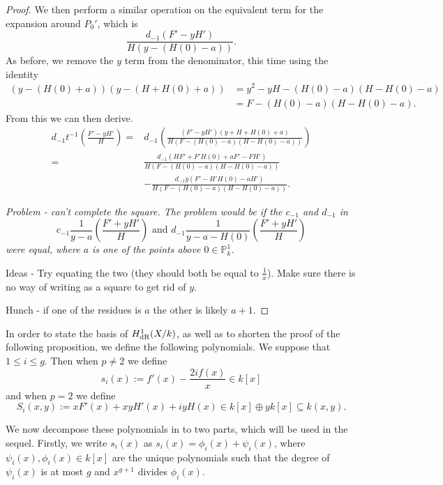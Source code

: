 \begin{proof}
We then perform a similar operation on the equivalent term for the expansion around $P_0'$, which is
\[
\frac{d_{-1}(F' - yH')}{H(y - (H(0) - a))}.
\]
As before, we remove the $y$ term from the denominator, this time using the identity
\begin{align*}
(y-(H(0)+a))(y - (H+H(0)+a)) &  = y^2 - yH - (H(0) - a)(H - H(0) - a) \\
& = F - (H(0)-a)(H - H(0) - a).
\end{align*}
From this we can then derive. 
\begin{align*}
d_{-1}t^{-1} \left( \frac{F' - yH'}{H} \right)  = & d_{-1}\left( \frac{(F'  - yH')(y+ H + H(0) + a)}{H(F -(H(0)-a)(H - H(0) -a ))} \right) \\
 =&  \frac{d_{-1}(HF' + F'H(0) + aF' - FH')}{H(F-(H(0) - a)(H - H(0) - a))}  \\
& - \frac{d_{-1}y(F' - H'H(0) - aH')}{H(F - (H(0) - a)( H - H(0) - a))}.
\end{align*}



{\sl Problem - can't complete the square. The problem would be if the $c_{-1}$ and $d_{-1}$ in 
\[
c_{-1}\frac{1}{y-a}\left(\frac{F'+yH'}{H}\right) \text{ and } d_{-1}\frac{1}{y-a-H(0)}\left(\frac{F'+yH'}{H}\right)
\]
were equal, where $a$ is one of the points above $0\in \mathbb P_k^1$.

Ideas - Try equating the two (they should both be equal to $\frac{1}{x}$).
Make sure there is no way of writing as a square to get rid of $y$.

Hunch - if one of the residues is $a$ the other is likely $a+1$.}
\end{proof}



In order to state the basis of $H_{\text {dR}}^1(X/k)$, as well as to shorten the proof of the following proposition, we define the following polynomials. 
We suppose that $1 \leq i \leq g$.
Then when $p\neq 2$ we define
\[
s_i(x) := f'(x) - \frac{2if(x)}{x} \in k[x]
\]
and when $p = 2$ we define
\begin{equation}\label{capitals}
S_i(x,y) := xF'(x) + xyH'(x) + iyH(x)\in k[x]\oplus yk[x] \subseteq k(x,y).
\end{equation}

We now decompose these polynomials in to two parts, which will be used in the sequel.
Firstly, we write $s_i(x)$ as $s_i(x) = \phi_i(x) + \psi_i(x)$, where $\psi_i(x), \phi_i(x) \in k[x]$ are the unique polynomials such that the degree of $\psi_i (x)$ is at most $g$ and $x^{g+1}$ divides $\phi_i(x)$.


